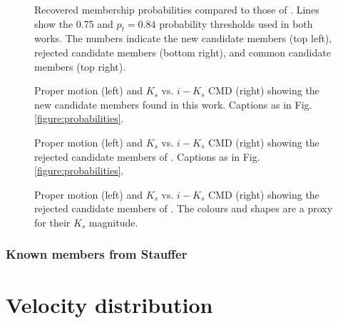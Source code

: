 \begin{figure}[htbp]
\begin{center}
\caption{Recovered membership probabilities compared to those of \citet{Bouy2015}. Lines show the 0.75 and $p_t=0.84$ probability thresholds used in both works. The numbers indicate the new candidate members (top left), rejected candidate members (bottom right), and common candidate members (top right).}
\label{figure:HM-SBB}
\end{center}
\end{figure}


 \begin{figure*}[htbp]
\begin{center}
\caption{Proper motion (left) and $K_s$ vs. $i-K_s$ CMD (right) showing the new candidate members found in this work. Captions as in Fig. \ref{figure:probabilities}.}
\label{figure:newones}
\end{center}
\end{figure*}

 \begin{figure*}[htbp]
\begin{center}
\caption{Proper motion (left) and $K_s$ vs. $i-K_s$ CMD (right) showing the rejected candidate members of \citet{Bouy2015}. Captions as in Fig. \ref{figure:probabilities}.}
\label{figure:rejecteds}
\end{center}
\end{figure*}

\begin{figure*}[htbp]
\begin{center}
\caption{Proper motion (left) and $K_s$ vs. $i-K_s$ CMD (right) showing the rejected candidate members of \citet{Bouy2015}. The colours and shapes are a proxy for their $K_s$ magnitude.}
\label{figure:rejectedsCOLORS}
\end{center}
\end{figure*}
\subsubsection{Known members from Stauffer}
\section{Velocity distribution}
